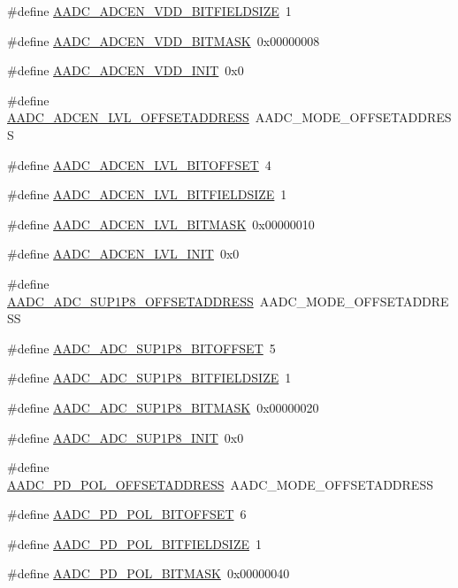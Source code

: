 \begin{DoxyCompactItemize}
\#define \hyperlink{a00543_a89e5566b93b597d73ca1f162a7f0d4c8}{AADC\_\-ADCEN\_\-VDD\_\-BITFIELDSIZE}~1
\item 
\#define \hyperlink{a00543_a17623b8378c68680a619ee54440f8c1e}{AADC\_\-ADCEN\_\-VDD\_\-BITMASK}~0x00000008
\item 
\#define \hyperlink{a00543_aafe144db4813a88015940d0ab1039a85}{AADC\_\-ADCEN\_\-VDD\_\-INIT}~0x0
\item 
\#define \hyperlink{a00543_aff17255634a2290d80570913a256822b}{AADC\_\-ADCEN\_\-LVL\_\-OFFSETADDRESS}~AADC\_\-MODE\_\-OFFSETADDRESS
\item 
\#define \hyperlink{a00543_a3dce6d4b89c8e3d128c55250894c67bf}{AADC\_\-ADCEN\_\-LVL\_\-BITOFFSET}~4
\item 
\#define \hyperlink{a00543_a28e2c3997178c86028333d6c151a7494}{AADC\_\-ADCEN\_\-LVL\_\-BITFIELDSIZE}~1
\item 
\#define \hyperlink{a00543_ae668d71d84d81bfec2617f04eaae8f23}{AADC\_\-ADCEN\_\-LVL\_\-BITMASK}~0x00000010
\item 
\#define \hyperlink{a00543_a070932e8fb07c354f4c7f6055f637d22}{AADC\_\-ADCEN\_\-LVL\_\-INIT}~0x0
\item 
\#define \hyperlink{a00543_acceddef4fee060990c3311823af78d73}{AADC\_\-ADC\_\-SUP1P8\_\-OFFSETADDRESS}~AADC\_\-MODE\_\-OFFSETADDRESS
\item 
\#define \hyperlink{a00543_ab517a8a28f8d6d7fe7573b43b9ad03b0}{AADC\_\-ADC\_\-SUP1P8\_\-BITOFFSET}~5
\item 
\#define \hyperlink{a00543_a2172d1df30974399a18dc5ac86e31426}{AADC\_\-ADC\_\-SUP1P8\_\-BITFIELDSIZE}~1
\item 
\#define \hyperlink{a00543_a7c92fd9a7de7d85b4310cebbdb5b9479}{AADC\_\-ADC\_\-SUP1P8\_\-BITMASK}~0x00000020
\item 
\#define \hyperlink{a00543_af8a018b7aa85fcd520cc0aacecea5347}{AADC\_\-ADC\_\-SUP1P8\_\-INIT}~0x0
\item 
\#define \hyperlink{a00543_a1982d487e4aeb00f37a0e7bd4e9f5c62}{AADC\_\-PD\_\-POL\_\-OFFSETADDRESS}~AADC\_\-MODE\_\-OFFSETADDRESS
\item 
\#define \hyperlink{a00543_a555da8a74d6e992084224e448079dfdb}{AADC\_\-PD\_\-POL\_\-BITOFFSET}~6
\item 
\#define \hyperlink{a00543_ae0782ebc66ecf46f58b889779ded7d77}{AADC\_\-PD\_\-POL\_\-BITFIELDSIZE}~1
\item 
\#define \hyperlink{a00543_a945161d6817da5d280ae869c504d59af}{AADC\_\-PD\_\-POL\_\-BITMASK}~0x00000040
\item 

\end{DoxyCompactItemize}
